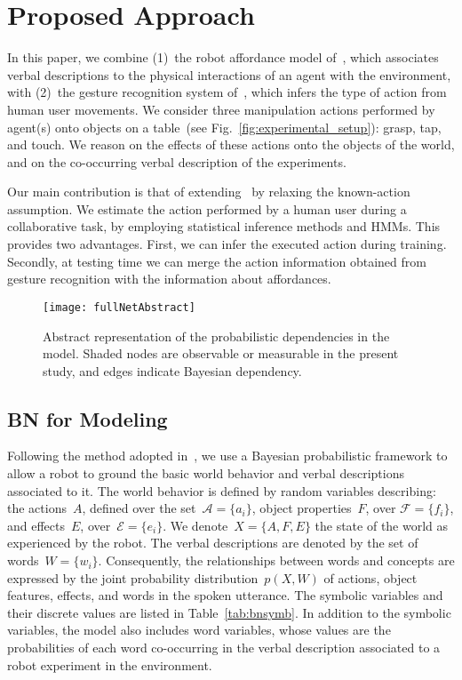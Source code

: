 
\section{Proposed Approach}

In this paper, we combine (1)~the robot affordance model of~\cite{salvi:2012:smcb}, which associates verbal descriptions to the physical interactions of an agent with the environment, with (2)~the gesture recognition system of~\cite{saponaro:2013:crhri}, which infers the type of action from human user movements. We consider three manipulation actions performed by agent(s) onto objects on a table~(see Fig.~\ref{fig:experimental_setup}): grasp, tap, and touch. We reason on the effects of these actions onto the objects of the world, and on the co-occurring verbal description of the experiments.


Our main contribution is that of extending~\cite{salvi:2012:smcb} by relaxing the known-action assumption. We estimate the action performed by a human user during a \hr{} collaborative task, by employing statistical inference methods and \acp{HMM}. This provides two advantages. First, we can infer the executed action during training. Secondly, at testing time we can merge the action information obtained from gesture recognition with the information about affordances.

\begin{figure}
  \centering
  \texttt{[image: fullNetAbstract]}
  \caption{Abstract representation of the probabilistic dependencies in the model. Shaded nodes are observable or measurable in the present study, and edges indicate Bayesian dependency.}
  \label{fig:model}
\end{figure}

\subsection{\acl{BN} for \AffWords{} Modeling}
\label{sec:bn}

Following the method adopted in~\cite{salvi:2012:smcb}, we use a Bayesian probabilistic framework to allow a robot to ground the basic world behavior and verbal descriptions associated to it. The world behavior is defined by random variables describing: the actions~$A$, defined over the set~$\mathcal{A} = \{a_i\}$, object properties~$F$, over $\mathcal{F} = \{f_i\}$, and effects~$E$, over~$\mathcal{E} = \{e_i\}$. We denote~$X = \{A, F, E\}$ the state of the world as experienced by the robot. The verbal descriptions are denoted by the set of words~$W = \{w_i\}$. Consequently, the relationships between words and concepts are expressed by the joint probability distribution~$p(X,W)$ of actions, object features, effects, and words in the spoken utterance. The symbolic variables and their discrete values are listed in Table~\ref{tab:bnsymb}. In addition to the symbolic variables, the model also includes word variables, whose values are the probabilities of each word co-occurring in the verbal description associated to a robot experiment in the environment.

